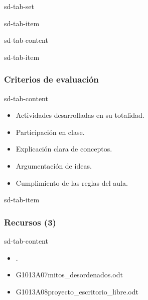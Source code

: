 \documentclass[letterpaper,10pt,spanish]{sphinxmanual}
\begin{document}
\begin{sphinxuseclass}{sd-tab-set}
\begin{sphinxuseclass}{sd-tab-item}
\begin{sphinxuseclass}{sd-tab-content}
\begin{itemize}
\end{itemize}

\end{sphinxuseclass}
\end{sphinxuseclass}
\begin{sphinxuseclass}{sd-tab-item}\subsubsection*{Criterios de evaluación}

\begin{sphinxuseclass}{sd-tab-content}\begin{itemize}
\item {} 
\sphinxAtStartPar
Actividades desarrolladas en su totalidad.

\item {} 
\sphinxAtStartPar
Participación en clase.

\item {} 
\sphinxAtStartPar
Explicación clara de conceptos.

\item {} 
\sphinxAtStartPar
Argumentación de ideas.

\item {} 
\sphinxAtStartPar
Cumplimiento de las reglas del aula.

\end{itemize}

\end{sphinxuseclass}
\end{sphinxuseclass}
\begin{sphinxuseclass}{sd-tab-item}\subsubsection*{Recursos (3)}

\begin{sphinxuseclass}{sd-tab-content}\begin{itemize}
\item {} 
\sphinxAtStartPar
{}.

\item {} 
\sphinxAtStartPar
G1013A07\sphinxhyphen{}mitos\_desordenados.odt 

\item {} 
\sphinxAtStartPar
G1013A08\sphinxhyphen{}proyecto\_escritorio\_libre.odt 

\end{itemize}

\end{sphinxuseclass}
\end{sphinxuseclass}
\end{sphinxuseclass}
\end{document}
